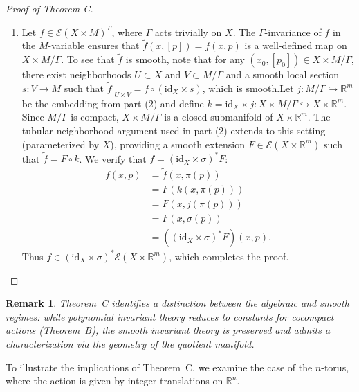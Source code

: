 \documentclass[]{article}
\newtheorem{remark}[theorem]{Remark}
\begin{document}
\begin{proof}[Proof of Theorem C]
\begin{enumerate}
		
		\item Let $f \in \mathcal{E}(X \times M)^\Gamma$, where $\Gamma$ acts trivially on $X$. The $\Gamma$-invariance of $f$ in the $M$-variable ensures that $\tilde{f}(x, [p]) = f(x, p)$ is a well-defined map on $X \times M/\Gamma$. To see that $\tilde{f}$ is smooth, note that for any $(x_0, [p_0]) \in X \times M/\Gamma$, there exist neighborhoods $U \subset X$ and $V \subset M/\Gamma$ and a smooth local section $s: V \to M$ such that $\tilde{f}|_{U \times V} = f \circ (\mathrm{id}_X \times s)$, which is smooth.Let $j: M/\Gamma \hookrightarrow \mathbb{R}^m$ be the embedding from part (2) and define $k = \mathrm{id}_X \times j: X \times M/\Gamma \hookrightarrow X \times \mathbb{R}^m$. Since $M/\Gamma$ is compact, $X \times M/\Gamma$ is a closed submanifold of $X \times \mathbb{R}^m$. The tubular neighborhood argument used in part (2) extends to this setting (parameterized by $X$), providing a smooth extension $F \in \mathcal{E}(X \times \mathbb{R}^m)$ such that $\tilde{f} = F \circ k$. We verify that $f = (\mathrm{id}_X \times \sigma)^* F$:
		\[\begin{aligned}
			f(x, p) &= \tilde{f}(x, \pi(p)) \\
			&= F(k(x, \pi(p))) \\
			&= F(x, j(\pi(p))) \\
			&= F(x, \sigma(p)) \\
			&= ((\mathrm{id}_X \times \sigma)^* F)(x, p).
		\end{aligned}
		\]
		Thus $f \in (\mathrm{id}_X \times \sigma)^* \mathcal{E}(X \times \mathbb{R}^m)$, which completes the proof.
	\end{enumerate}
\end{proof}

\begin{remark}
	Theorem~C identifies a distinction between the algebraic and smooth regimes: while polynomial invariant theory reduces to constants for cocompact actions (Theorem~B), the smooth invariant theory is preserved and admits a characterization via the geometry of the quotient manifold.
\end{remark}

To illustrate the implications of Theorem~C, we examine the case of the $n$-torus, where the action is given by integer translations on $\mathbb{R}^n$.
\end{document}
